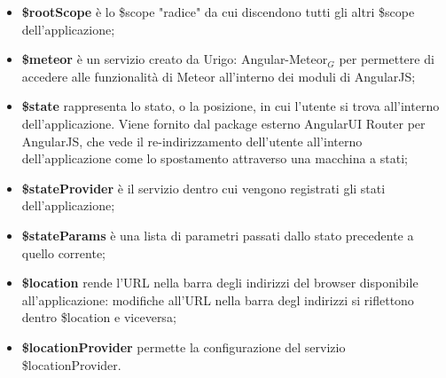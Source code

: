 \begin{itemize}
\item \textbf{\$rootScope} è lo \$scope "radice" da cui discendono tutti gli altri \$scope dell'applicazione;
\item \textbf{\$meteor} è un servizio creato da Urigo: Angular-Meteor$_G$ per permettere di accedere alle funzionalità di Meteor all'interno dei moduli di AngularJS;
\item \textbf{\$state} rappresenta lo stato, o la posizione, in cui l'utente si trova all'interno dell'applicazione. Viene fornito dal package esterno AngularUI Router per AngularJS, che vede il re-indirizzamento dell'utente all'interno dell'applicazione come lo spostamento attraverso una macchina a stati;
\item \textbf{\$stateProvider} è il servizio dentro cui vengono registrati gli stati dell'applicazione;
\item \textbf{\$stateParams} è una lista di parametri passati dallo stato precedente a quello corrente;
\item \textbf{\$location} rende l'URL nella barra degli indirizzi del browser disponibile all'applicazione: modifiche all'URL nella barra degl indirizzi si riflettono dentro \$location e viceversa;
\item \textbf{\$locationProvider} permette la configurazione del servizio \$locationProvider.

\end{itemize}
